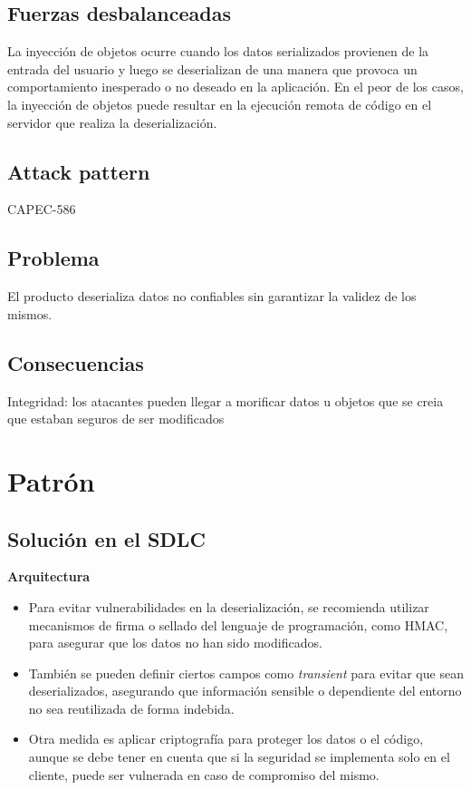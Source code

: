 \subsection{Fuerzas desbalanceadas}
La inyección de objetos ocurre cuando los datos serializados provienen de la entrada del usuario y luego se deserializan de una manera que provoca un comportamiento inesperado o no deseado en la aplicación. En el peor de los casos, la inyección de objetos puede resultar en la ejecución remota de código en el servidor que realiza la deserialización.
\subsection{Attack pattern}
CAPEC-586
\subsection{Problema}
El producto deserializa datos no confiables sin garantizar la validez de los mismos.
\subsection{Consecuencias}
Integridad: los atacantes pueden llegar a morificar datos u objetos que se creia que estaban seguros de ser modificados
\section{Patrón}

\subsection{Solución en el SDLC}

\textbf{Arquitectura}
\begin{itemize}
    \item Para evitar vulnerabilidades en la deserialización, se recomienda utilizar mecanismos de firma o sellado del lenguaje de programación, como HMAC, para asegurar que los datos no han sido modificados.
    \item También se pueden definir ciertos campos como \textit{transient} para evitar que sean deserializados, asegurando que información sensible o dependiente del entorno no sea reutilizada de forma indebida.
    \item Otra medida es aplicar criptografía para proteger los datos o el código, aunque se debe tener en cuenta que si la seguridad se implementa solo en el cliente, puede ser vulnerada en caso de compromiso del mismo.
\end{itemize}

